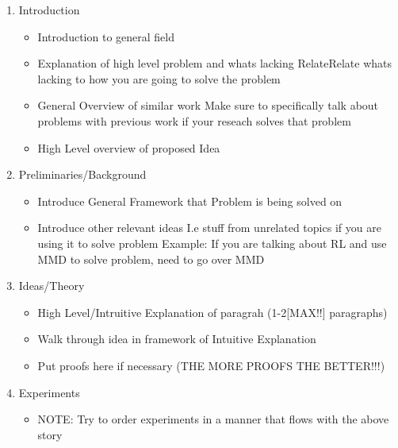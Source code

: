 
\ifExtendedAbstract
    \ifShowOutlineHelp
        \begin{enumerate}
        \item Introduction
        \begin{itemize}
            \item Introduction to general field
            \item Explanation of high level problem and whats lacking 
                \subitem RelateRelate whats lacking to how you are going to solve the problem
            \item General Overview of similar work
                \subitem Make sure to specifically talk about problems with previous work if your reseach solves that problem
            \item High Level overview of proposed Idea
        \end{itemize}
    
        \item Preliminaries/Background
            \begin{itemize}
            \item Introduce General Framework that Problem is being solved on
            \item Introduce other relevant ideas
                \subitem I.e stuff from unrelated topics if you are using it to solve problem
                \subitem Example: If you are talking about RL and use MMD to solve problem, need to go over MMD
            \end{itemize}
            
            
        \item Ideas/Theory
            \begin{itemize}
                \item High Level/Intruitive Explanation of paragrah (1-2[MAX!!] paragraphs)
                \item Walk through idea in framework of Intuitive Explanation 
                \item Put proofs here if necessary (ΤΗΕ ΜΟRE PROOFS THE BETTER!!!)
            \end{itemize}
    
        \item Experiments
            \begin{itemize}
            \item NOTE: Try to order experiments in a manner that flows with the above story
            \end{itemize}
    

\end{enumerate}

